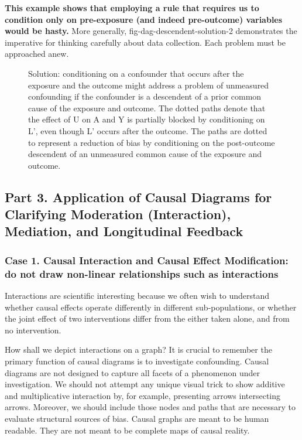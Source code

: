 \documentclass[
  singlecolumn,
  9pt]{article}
\begin{document}
\textbf{This example shows that employing a rule that requires us to
condition only on pre-exposure (and indeed pre-outcome) variables would
be hasty.} More generally, fig-dag-descendent-solution-2 demonstrates
the imperative for thinking carefully about data collection. Each
problem must be approached anew.

\begin{figure}


\caption{\label{fig-dag-descendent-solution-2}Solution: conditioning on
a confounder that occurs after the exposure and the outcome might
address a problem of unmeasured confounding if the confounder is a
descendent of a prior common cause of the exposure and outcome. The
dotted paths denote that the effect of U on A and Y is partially blocked
by conditioning on L', even though L' occurs after the outcome. The
paths are dotted to represent a reduction of bias by conditioning on the
post-outcome descendent of an unmeasured common cause of the exposure
and outcome.}

\end{figure}%

\subsection{Part 3. Application of Causal Diagrams for Clarifying
Moderation (Interaction), Mediation, and Longitudinal
Feedback}\label{part-3.-application-of-causal-diagrams-for-clarifying-moderation-interaction-mediation-and-longitudinal-feedback}

\subsubsection{Case 1. Causal Interaction and Causal Effect
Modification: do not draw non-linear relationships such as
interactions}\label{case-1.-causal-interaction-and-causal-effect-modification-do-not-draw-non-linear-relationships-such-as-interactions}

Interactions are scientific interesting because we often wish to
understand whether causal effects operate differently in different
sub-populations, or whether the joint effect of two interventions differ
from the either taken alone, and from no intervention.

How shall we depict interactions on a graph? It is crucial to remember
the primary function of causal diagrams is to investigate confounding.
Causal diagrams are not designed to capture all facets of a phenomenon
under investigation. We should not attempt any unique visual trick to
show additive and multiplicative interaction by, for example, presenting
arrows intersecting arrows. Moreover, we should include those nodes and
paths that are necessary to evaluate structural sources of bias. Causal
graphs are meant to be human readable. They are not meant to be complete
maps of causal reality.
\end{document}
